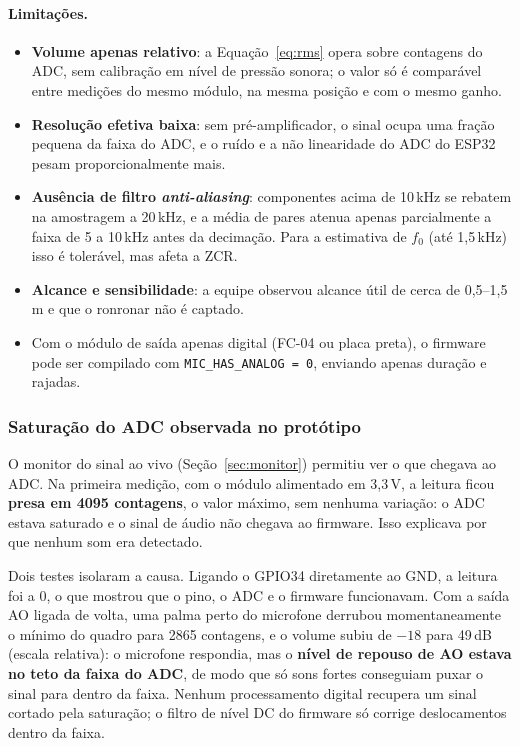 \paragraph{Limitações.}
\begin{itemize}
  \item \textbf{Volume apenas relativo}: a Equação~\eqref{eq:rms} opera sobre contagens do ADC, sem calibração em nível de pressão sonora; o valor só é comparável entre medições do mesmo módulo, na mesma posição e com o mesmo ganho.
  \item \textbf{Resolução efetiva baixa}: sem pré-amplificador, o sinal ocupa uma fração pequena da faixa do ADC, e o ruído e a não linearidade do ADC do ESP32 \citep{esp32datasheet} pesam proporcionalmente mais.
  \item \textbf{Ausência de filtro \textit{anti-aliasing}}: componentes acima de 10\,kHz se rebatem na amostragem a 20\,kHz, e a média de pares atenua apenas parcialmente a faixa de 5 a 10\,kHz antes da decimação. Para a estimativa de $f_0$ (até 1,5\,kHz) isso é tolerável, mas afeta a ZCR.
  \item \textbf{Alcance e sensibilidade}: a equipe observou alcance útil de cerca de 0,5--1,5\,m e que o ronronar não é captado. 
  \item Com o módulo de saída apenas digital (FC-04 ou placa preta), o firmware pode ser compilado com \texttt{MIC\_HAS\_ANALOG = 0}, enviando apenas duração e rajadas.
\end{itemize}

\subsubsection{Saturação do ADC observada no protótipo}
\label{sec:mic-saturacao}

O monitor do sinal ao vivo (Seção~\ref{sec:monitor}) permitiu ver o que chegava ao ADC. Na primeira medição, com o módulo alimentado em 3,3\,V, a leitura ficou \textbf{presa em 4095 contagens}, o valor máximo, sem nenhuma variação: o ADC estava saturado e o sinal de áudio não chegava ao firmware. Isso explicava por que nenhum som era detectado.

Dois testes isolaram a causa. Ligando o GPIO34 diretamente ao GND, a leitura foi a 0, o que mostrou que o pino, o ADC e o firmware funcionavam. Com a saída AO ligada de volta, uma palma perto do microfone derrubou momentaneamente o mínimo do quadro para 2865 contagens, e o volume subiu de $-18$ para 49\,dB (escala relativa): o microfone respondia, mas o \textbf{nível de repouso de AO estava no teto da faixa do ADC}, de modo que só sons fortes conseguiam puxar o sinal para dentro da faixa. Nenhum processamento digital recupera um sinal cortado pela saturação; o filtro de nível DC do firmware só corrige deslocamentos dentro da faixa.

